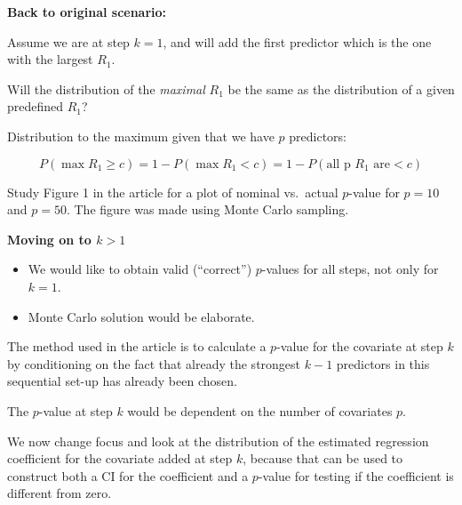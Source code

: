 \documentclass[
  ignorenonframetext,
]{beamer}
\providecommand{\tightlist}{%
  \setlength{\itemsep}{0pt}\setlength{\parskip}{0pt}}
\begin{document}
\begin{frame}

\textbf{Back to original scenario:}

Assume we are at step \(k=1\), and will add the first predictor which is
the one with the largest \(R_1\).

Will the distribution of the \emph{maximal} \(R_1\) be the same as the
distribution of a given predefined \(R_1\)?

Distribution to the maximum given that we have \(p\) predictors:

\[ P(\max R_1 \ge c)=1-P(\max R_1 < c)=1-P(\text{all p } R_1 \text{ are} <c)\]

Study Figure 1 in the article for a plot of nominal vs.~actual
\(p\)-value for \(p=10\) and \(p=50\). The figure was made using Monte
Carlo sampling.

\end{frame}

\begin{frame}

\textbf{Moving on to \(k>1\)}

\begin{itemize}
\tightlist
\item
  We would like to obtain valid (``correct'') \(p\)-values for all
  steps, not only for \(k=1\).
\item
  Monte Carlo solution would be elaborate.
\end{itemize}

The method used in the article is to calculate a \(p\)-value for the
covariate at step \(k\) by conditioning on the fact that already the
strongest \(k-1\) predictors in this sequential set-up has already been
chosen.

The \(p\)-value at step \(k\) would be dependent on the number of
covariates \(p\).

We now change focus and look at the distribution of the estimated
regression coefficient for the covariate added at step \(k\), because
that can be used to construct both a CI for the coefficient and a
\(p\)-value for testing if the coefficient is different from zero.

\end{frame}
\end{document}
